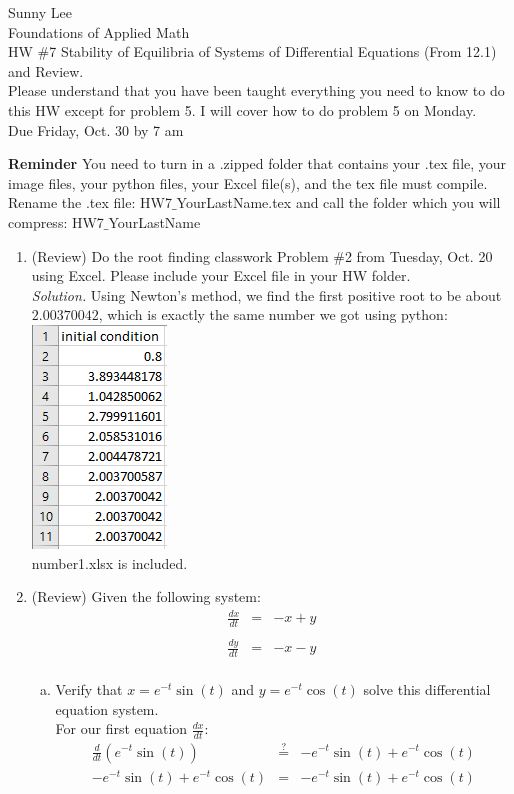 \documentclass[12pt,letterpaper]{article}
\begin{document}
Sunny Lee\\
Foundations of Applied Math\\
 HW \#7 Stability of Equilibria of Systems of Differential Equations (From 12.1) and Review.\\
 Please understand that you have been taught everything you need to know to do this HW except for problem 5. I will cover how to do problem 5 on Monday.\\
 Due Friday, Oct. 30 by 7 am
 
\textbf{Reminder} You need to turn in a .zipped folder that contains your .tex file, your image files, your python files, your Excel file(s), and the tex file must compile.
Rename the .tex file: HW7$\_$YourLastName.tex and call the folder which you will compress: HW7$\_$YourLastName


\begin{enumerate}
\item  (Review) Do the root finding classwork Problem \#2 from Tuesday, Oct. 20 using Excel. Please include your Excel file in your HW folder.\\
\emph{Solution.}
Using Newton's method, we find the first positive root to be about $2.00370042$, which 
is exactly the same number we got using python: \\
\includegraphics{number1.png}\\
number1.xlsx is included. 

\item  (Review) Given the following system:
\begin{eqnarray*}
\frac{dx}{dt} &=&-x+y\\ \\
\frac{dy}{dt}&=&-x-y\\
\end{eqnarray*}

\begin{enumerate}[a)]
\item Verify that $x=e^{-t}\sin(t)$ and $y=e^{-t}\cos(t)$ solve this differential equation system.\\
For our first equation $\frac{dx}{dt}$: 
\begin{eqnarray}
  \frac{d}{dt}(e^{-t}\sin(t)) &\stackrel{?}{=}& -e^{-t}\sin(t) + e^{-t}\cos(t)\\
  - e^{-t}\sin(t) + e^{-t}\cos(t) &\stackrel{}{=}& -e^{-t}\sin(t) + e^{-t}\cos(t)\\
\end{eqnarray}


\end{enumerate}
\end{enumerate}
\end{document}

